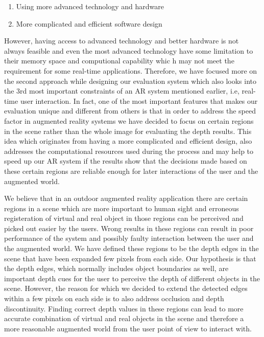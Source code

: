 \documentclass[dvips,letterpaper,12pt]{report}
\begin{document}
\begin{enumerate}
\item Using more advanced technology and hardware
\item More complicated and efficient software design
\end{enumerate}
However, having access to advanced technology and better hardware is not always feasible and even the most advanced technology have some limitation to their memory space and computional capability whic
h may not meet the requirement for some real-time applications. 
Therefore, we have focused more on the second approach while designing our evaluation system which also looks into the 3rd most important constraints of
an AR system mentioned earlier, i.e, real-time user interaction. \newline 
In fact, one of the most important features that makes our evaluation unique and different from others is that in order to
address the speed factor in augmented reality systems we have decided to focus on certain regions in the scene rather than the whole image for evaluating the depth results. 
This idea which originates from having a more complicated and efficient design, also addresses the computational resources used during the process and may help to speed up our AR system if 
the results show that the decisions made based on these certain regions are reliable enough for later interactions of the user and the augmented world.

We believe that in an outdoor augmented reality application there are certain regions in a scene which are more important to human sight and erroneous registeration of virtual and 
real object in those regions can be perceived and picked out easier by the users. Wrong results in these regions can result in poor performance of the system and possibly faulty interaction between 
the user and the augmented world. We have defined these regions to be the depth edges in the scene that have been expanded few pixels from each side. 
Our hypothesis is that the depth edges, which normally includes object boundaries as well, are important depth cues for the user to perceive the depth of different objects in the scene. 
However, the reason for which we decided to extend the detected edges within a few pixels on each side is to also address occlusion and depth discontinuity. Finding correct depth values in these 
regions can lead to more accurate combination of virtual and real objects in the scene and therefore a more reasonable augmented world from the user point of view to interact with. \newline
\newline
\end{document}
